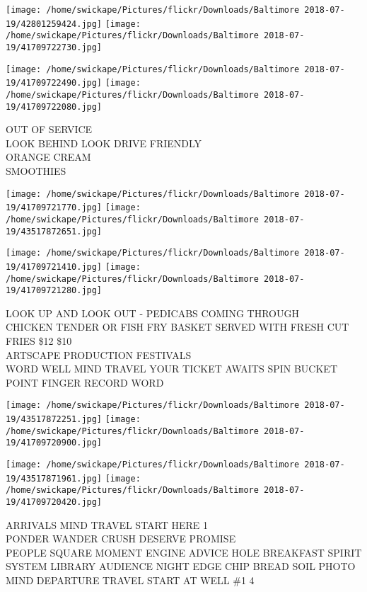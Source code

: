 \documentclass[10pt,letterpaper]{article}
\begin{document}
\texttt{[image: /home/swickape/Pictures/flickr/Downloads/Baltimore 2018-07-19/42801259424.jpg]}
\texttt{[image: /home/swickape/Pictures/flickr/Downloads/Baltimore 2018-07-19/41709722730.jpg]}

\texttt{[image: /home/swickape/Pictures/flickr/Downloads/Baltimore 2018-07-19/41709722490.jpg]}
\texttt{[image: /home/swickape/Pictures/flickr/Downloads/Baltimore 2018-07-19/41709722080.jpg]}

OUT OF SERVICE\\
LOOK BEHIND LOOK DRIVE FRIENDLY\\
ORANGE CREAM\\
SMOOTHIES
\pagebreak

\texttt{[image: /home/swickape/Pictures/flickr/Downloads/Baltimore 2018-07-19/41709721770.jpg]}
\texttt{[image: /home/swickape/Pictures/flickr/Downloads/Baltimore 2018-07-19/43517872651.jpg]}

\texttt{[image: /home/swickape/Pictures/flickr/Downloads/Baltimore 2018-07-19/41709721410.jpg]}
\texttt{[image: /home/swickape/Pictures/flickr/Downloads/Baltimore 2018-07-19/41709721280.jpg]}

LOOK UP AND LOOK OUT {-} PEDICABS COMING THROUGH\\
CHICKEN TENDER OR FISH FRY BASKET SERVED WITH FRESH CUT FRIES \$12 \$10\\
ARTSCAPE PRODUCTION FESTIVALS\\
WORD WELL MIND TRAVEL YOUR TICKET AWAITS SPIN BUCKET POINT FINGER RECORD WORD
\pagebreak

\texttt{[image: /home/swickape/Pictures/flickr/Downloads/Baltimore 2018-07-19/43517872251.jpg]}
\texttt{[image: /home/swickape/Pictures/flickr/Downloads/Baltimore 2018-07-19/41709720900.jpg]}

\texttt{[image: /home/swickape/Pictures/flickr/Downloads/Baltimore 2018-07-19/43517871961.jpg]}
\texttt{[image: /home/swickape/Pictures/flickr/Downloads/Baltimore 2018-07-19/41709720420.jpg]}

ARRIVALS MIND TRAVEL START HERE 1\\
PONDER WANDER CRUSH DESERVE PROMISE\\
PEOPLE SQUARE MOMENT ENGINE ADVICE HOLE BREAKFAST SPIRIT SYSTEM LIBRARY AUDIENCE NIGHT EDGE CHIP BREAD SOIL PHOTO\\
MIND DEPARTURE TRAVEL START AT WELL \#1 4
\pagebreak
\end{document}
